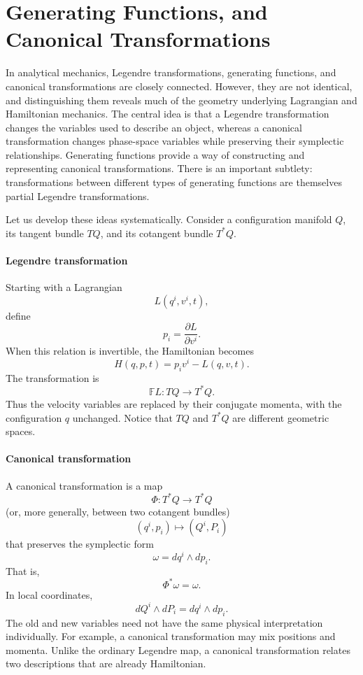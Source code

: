 \section{Generating Functions, and Canonical Transformations}
In analytical mechanics, Legendre transformations, generating functions, and
canonical transformations are closely connected. However, they are not
identical, and distinguishing them reveals much of the geometry underlying
Lagrangian and Hamiltonian mechanics.
The central idea is that a Legendre transformation changes the variables used
to describe an object, whereas a canonical transformation changes phase-space
variables while preserving their symplectic relationships. Generating functions
provide a way of constructing and representing canonical transformations.
There is an important subtlety: transformations between different types of
generating functions are themselves partial Legendre transformations.

Let us develop these ideas systematically.
Consider a configuration manifold \(Q\), its tangent bundle \(TQ\), and its
cotangent bundle \(T^*Q\).
\paragraph{ Legendre transformation}
Starting with a Lagrangian
\[
L(q^i,v^i,t),
\]
define
\[
p_i=\frac{\partial L}{\partial v^i}.
\]
When this relation is invertible, the Hamiltonian becomes
\[
\boxed{H(q,p,t)=p_iv^i-L(q,v,t).}
\]
The transformation is
\[
\mathbb FL:TQ\longrightarrow T^*Q.
\]
Thus the velocity variables are replaced by their conjugate momenta, with the
configuration \(q\) unchanged.
Notice that \(TQ\) and \(T^*Q\) are different geometric spaces.

\paragraph{Canonical transformation}
A canonical transformation is a map
\[
\Phi:T^*Q\longrightarrow T^*Q
\]
(or, more generally, between two cotangent bundles)
\[
(q^i,p_i)\longmapsto(Q^i,P_i)
\]
that preserves the symplectic form
\[
\boxed{
\omega=dq^i\wedge dp_i.
}
\]
That is,
\[
\boxed{\Phi^*\omega=\omega.}
\]
In local coordinates,
\[
\boxed{
dQ^i\wedge dP_i=dq^i\wedge dp_i.
}
\]
The old and new variables need not have the same physical interpretation
individually. For example, a canonical transformation may mix positions and
momenta.
Unlike the ordinary Legendre map, a canonical transformation relates two
descriptions that are already Hamiltonian.

